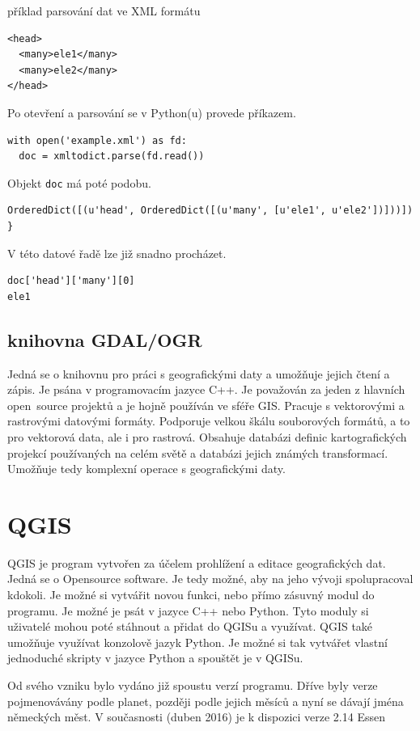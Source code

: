 příklad parsování dat ve XML formátu

{\scriptsize
\begin{lstlisting}
<head>
  <many>ele1</many>
  <many>ele2</many>
</head>
\end{lstlisting}
}

Po otevření a parsování se v Python(u) provede příkazem.

{\scriptsize
\lstset{language=Python}
\begin{lstlisting}
with open('example.xml') as fd: 
  doc = xmltodict.parse(fd.read()) 
\end{lstlisting}
}

Objekt {\tt doc} má poté podobu.

{\scriptsize
\lstset{language=Python}
\begin{lstlisting}
OrderedDict([(u'head', OrderedDict([(u'many', [u'ele1', u'ele2'])]))]) }
\end{lstlisting}
}

V této datové řadě lze již snadno procházet. 

{\scriptsize
\lstset{language=Python}
\begin{lstlisting}
doc['head']['many'][0]
ele1
\end{lstlisting}
}


\subsection{knihovna GDAL/OGR}
\label{GDAL/OGR}
Jedná se o knihovnu pro práci s geografickými daty a umožňuje jejich čtení a zápis.
Je psána v programovacím jazyce C++. Je považován za jeden z hlavních 
open~source projektů a je hojně používán ve sféře GIS. Pracuje s vektorovými a 
rastrovými datovými formáty. Podporuje velkou škálu souborových formátů, a to 
pro vektorová data, ale i pro rastrová. Obsahuje databázi definic kartografických
projekcí používaných na celém světě a databázi jejich známých transformací. 
Umožňuje tedy komplexní operace s geografickými daty. \cite{GDAL}


\section{QGIS}
\label{QGIS}
QGIS je program vytvořen za účelem prohlížení a editace geografických dat.
Jedná se o Opensource software. Je tedy možné, aby na jeho vývoji spolupracoval
kdokoli. Je možné si vytvářit novou funkci, nebo přímo zásuvný modul do programu.
Je možné je psát v jazyce C++ nebo Python.
Tyto moduly si uživatelé mohou poté stáhnout a přidat do QGISu a využívat.
QGIS také umožňuje využívat konzolově jazyk Python. Je možné si tak vytvářet
vlastní jednoduché skripty v jazyce Python a spouštět je v QGISu.

Od svého vzniku bylo vydáno již spoustu verzí programu.
Dříve byly verze pojmenovávány podle planet, později podle jejich měsíců a nyní se dávají
jména německých měst. V současnosti (duben 2016) je k dispozici verze 2.14 Essen
